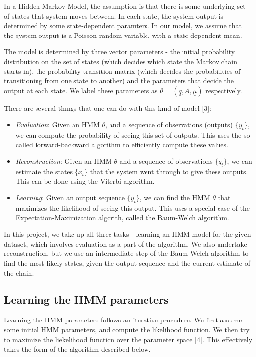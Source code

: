 \documentclass[11pt, twoside]{article}
\begin{document}
In a Hidden Markov Model, the assumption is that there is some underlying set of states that system moves between. In each state, the system output is determined by some state-dependent paramters. In our model, we assume that the system output is a Poisson random variable, with a state-dependent mean.

The model is determined by three vector parameters - the initial probability distribution on the set of states (which decides which state the Markov chain starts in), the probability transition matrix (which decides the probabilities of transitioning from one state to another) and the parameters that decide the output at each state. We label these parameters as $\theta = (\underline{q}, A, \underline{\mu})$ respectively.

There are several things that one can do with this kind of model [3]:
\begin{itemize}
	\item \emph{Evaluation}: Given an HMM $\theta$, and a sequence of observations (outputs) $\{y_t\}$, we can compute the probability of seeing this set of outputs. This uses the so-called forward-backward algorithm to efficiently compute these values.
	\item \emph{Reconstruction}: Given an HMM $\theta$ and a sequence of observations $\{y_t\}$, we can estimate the states $\{x_t\}$ that the system went through to give these outputs. This can be done using the Viterbi algorithm.
	\item \emph{Learning}: Given an output sequence $\{y_t\}$, we can find the HMM $\theta$ that maximizes the likelihood of seeing this output. This uses a special case of the Expectation-Maximization algorith, called the Baum-Welch algorithm.
\end{itemize}

In this project, we take up all three tasks - learning an HMM model for the given dataset, which involves evaluation as a part of the algorithm. We also undertake reconstruction, but we use an intermediate step of the Baum-Welch algorithm to find the most likely states, given the output sequence and the current estimate of the chain.

\subsection{Learning the HMM parameters}

Learning the HMM parameters follows an iterative procedure. We first assume some initial HMM parameters, and compute the likelihood function. We then try to maximize the liekelihood function over the parameter space [4]. This effectively takes the form of the algorithm described below.
\end{document}
